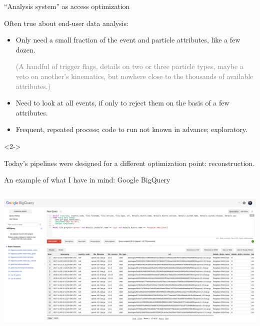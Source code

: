 \documentclass[aspectratio=169]{beamer}
\begin{document}
\begin{frame}{``Analysis system'' as access optimization}
\vspace{0.25 cm}
\begin{block}{Often true about end-user data analysis:}
\begin{itemize}\setlength{\itemsep}{0.35 cm}
\item Only need a small fraction of the event and particle attributes, like a few dozen.

\vspace{0.1 cm}
\textcolor{gray}{(A handful of trigger flags, details on two or three particle types, maybe a veto on another's kinematics, but nowhere close to the thousands of available attributes.)}

\item Need to look at all events, if only to reject them on the basis of a few attributes.

\item Frequent, repeated process; code to run not known in advance; exploratory.
\end{itemize}
\end{block}

\begin{uncoverenv}<2->\begin{block}{Today's pipelines were designed for a different optimization point: reconstruction.}
\vspace{0.25 cm}
\end{block}
\end{uncoverenv}
\end{frame}

\begin{frame}{An example of what I have in mind: Google BigQuery}
\vspace{0.25 cm}
\begin{columns}
\includegraphics[width=\linewidth]{bigquery.png}
\end{columns}
\end{frame}
\end{document}
